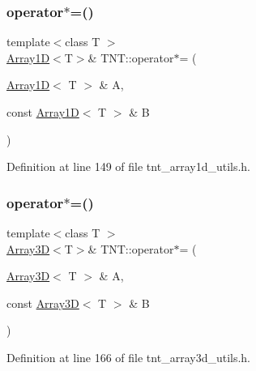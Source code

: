 \subsubsection{\texorpdfstring{operator$\ast$=()}{operator*=()}\hspace{0.1cm}{\footnotesize\ttfamily [1/5]}}
{\footnotesize\ttfamily template$<$class T $>$ \\
\hyperlink{classTNT_1_1Array1D}{Array1D}$<$T$>$\& T\+N\+T\+::operator$\ast$= (\begin{DoxyParamCaption}\item[{\hyperlink{classTNT_1_1Array1D}{Array1D}$<$ T $>$ \&}]{A,  }\item[{const \hyperlink{classTNT_1_1Array1D}{Array1D}$<$ T $>$ \&}]{B }\end{DoxyParamCaption})}



Definition at line 149 of file tnt\+\_\+array1d\+\_\+utils.\+h.

\mbox{\label{namespaceTNT_a537d33bfd218ca51057f36162d042ada}} 
\subsubsection{\texorpdfstring{operator$\ast$=()}{operator*=()}\hspace{0.1cm}{\footnotesize\ttfamily [2/5]}}
{\footnotesize\ttfamily template$<$class T $>$ \\
\hyperlink{classTNT_1_1Array3D}{Array3D}$<$T$>$\& T\+N\+T\+::operator$\ast$= (\begin{DoxyParamCaption}\item[{\hyperlink{classTNT_1_1Array3D}{Array3D}$<$ T $>$ \&}]{A,  }\item[{const \hyperlink{classTNT_1_1Array3D}{Array3D}$<$ T $>$ \&}]{B }\end{DoxyParamCaption})}



Definition at line 166 of file tnt\+\_\+array3d\+\_\+utils.\+h.

\mbox{\label{namespaceTNT_a383a5db478d4a5d28169b06dfe3bbd96}} 
